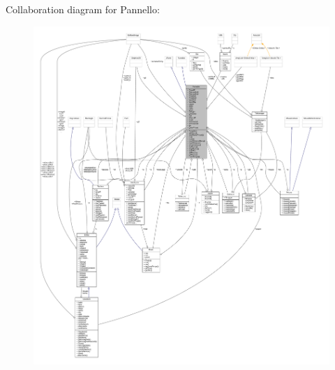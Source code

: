Collaboration diagram for Pannello\+:
\nopagebreak
\begin{figure}[H]
\begin{center}
\leavevmode
\includegraphics[width=350pt]{classa_1_1survival_1_1game_1_1_pannello__coll__graph}
\end{center}
\end{figure}
